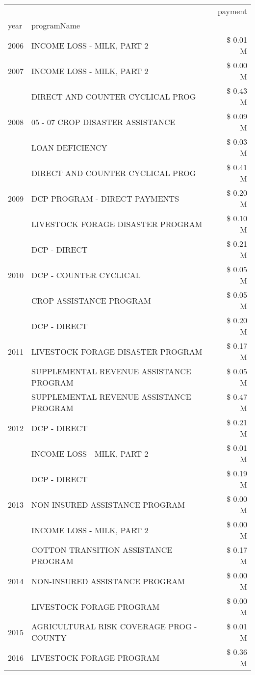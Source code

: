 \begin{tabular}{llr}
\toprule
 &  & payment \\
year & programName &  \\
\midrule
2006 & INCOME LOSS - MILK, PART 2 & \$ 0.01 M \\
\cline{1-3}
2007 & INCOME LOSS - MILK, PART 2 & \$ 0.00 M \\
\cline{1-3}
\multirow[t]{3}{*}{2008} & DIRECT AND COUNTER CYCLICAL PROG & \$ 0.43 M \\
 & 05 - 07 CROP DISASTER ASSISTANCE & \$ 0.09 M \\
 & LOAN DEFICIENCY & \$ 0.03 M \\
\cline{1-3}
\multirow[t]{3}{*}{2009} & DIRECT AND COUNTER CYCLICAL PROG & \$ 0.41 M \\
 & DCP PROGRAM - DIRECT PAYMENTS & \$ 0.20 M \\
 & LIVESTOCK FORAGE DISASTER  PROGRAM & \$ 0.10 M \\
\cline{1-3}
\multirow[t]{3}{*}{2010} & DCP - DIRECT & \$ 0.21 M \\
 & DCP - COUNTER CYCLICAL & \$ 0.05 M \\
 & CROP ASSISTANCE PROGRAM & \$ 0.05 M \\
\cline{1-3}
\multirow[t]{3}{*}{2011} & DCP - DIRECT & \$ 0.20 M \\
 & LIVESTOCK FORAGE DISASTER PROGRAM & \$ 0.17 M \\
 & SUPPLEMENTAL REVENUE ASSISTANCE PROGRAM & \$ 0.05 M \\
\cline{1-3}
\multirow[t]{3}{*}{2012} & SUPPLEMENTAL REVENUE ASSISTANCE PROGRAM & \$ 0.47 M \\
 & DCP - DIRECT & \$ 0.21 M \\
 & INCOME LOSS - MILK, PART 2 & \$ 0.01 M \\
\cline{1-3}
\multirow[t]{3}{*}{2013} & DCP - DIRECT & \$ 0.19 M \\
 & NON-INSURED ASSISTANCE PROGRAM & \$ 0.00 M \\
 & INCOME LOSS - MILK, PART 2 & \$ 0.00 M \\
\cline{1-3}
\multirow[t]{3}{*}{2014} & COTTON TRANSITION ASSISTANCE PROGRAM & \$ 0.17 M \\
 & NON-INSURED ASSISTANCE PROGRAM & \$ 0.00 M \\
 & LIVESTOCK FORAGE PROGRAM & \$ 0.00 M \\
\cline{1-3}
2015 & AGRICULTURAL RISK COVERAGE PROG - COUNTY & \$ 0.01 M \\
\cline{1-3}
\multirow[t]{3}{*}{2016} & LIVESTOCK FORAGE PROGRAM & \$ 0.36 M \\

\end{tabular}
